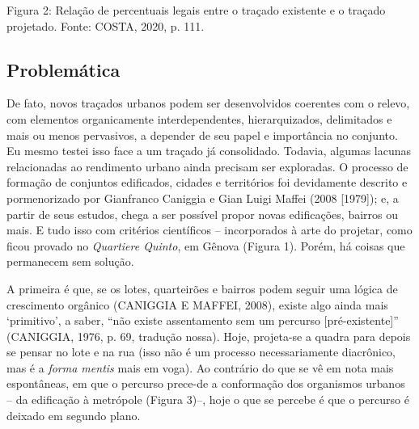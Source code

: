 \documentclass[twoside, 12pt, english,italian,latin,greek,french,spanish,brazil]{book}
\begin{document}
        \caption{Figura 2: Relação de percentuais legais entre o traçado existente e o traçado projetado. Fonte: COSTA, 2020, p. 111.}

    \subsection{Problemática}

        De fato, novos traçados urbanos podem ser desenvolvidos coerentes com o relevo, com elementos organicamente interdependentes, hierarquizados, delimitados e mais ou menos pervasivos, a depender de seu papel e importância no conjunto. Eu mesmo testei isso face a um traçado já consolidado. Todavia, algumas lacunas relacionadas ao rendimento urbano ainda precisam ser exploradas. O processo de formação de conjuntos edificados, cidades e territórios foi devidamente descrito e pormenorizado por Gianfranco Caniggia e Gian Luigi Maffei (2008 [1979]); e, a partir de seus estudos, chega a ser possível propor novas edificações, bairros ou mais. E tudo isso com critérios científicos – incorporados à arte do projetar, como ficou provado no \textit{Quartiere Quinto}, em Gênova (Figura 1). Porém, há coisas que permanecem sem solução.

        A primeira é que, se os lotes, quarteirões e bairros podem seguir uma lógica de crescimento orgânico (CANIGGIA E MAFFEI, 2008), existe algo ainda mais ‘primitivo’, a saber, “não existe assentamento sem um percurso [pré-existente]” (CANIGGIA, 1976, p. 69, tradução nossa). Hoje, projeta-se a quadra para depois se pensar no lote e na rua (isso não é um processo necessariamente diacrônico, mas é a \textit{forma mentis} mais em voga). Ao contrário do que se vê em nota mais espontâneas, em que o percurso prece-de a conformação dos organismos urbanos – da edificação à metrópole (Figura 3)–,   hoje o que se percebe é que o percurso é deixado em segundo plano.
\end{document}
